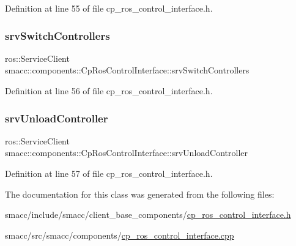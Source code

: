 Definition at line 55 of file cp\+\_\+ros\+\_\+control\+\_\+interface.\+h.

\mbox{\label{classsmacc_1_1components_1_1CpRosControlInterface_a78e45e68567c23ca5c19df0de257c20f}} 
\subsubsection{\texorpdfstring{srv\+Switch\+Controllers}{srvSwitchControllers}}
{\footnotesize\ttfamily ros\+::\+Service\+Client smacc\+::components\+::\+Cp\+Ros\+Control\+Interface\+::srv\+Switch\+Controllers\hspace{0.3cm}{\ttfamily [private]}}



Definition at line 56 of file cp\+\_\+ros\+\_\+control\+\_\+interface.\+h.

\mbox{\label{classsmacc_1_1components_1_1CpRosControlInterface_a0515a2a86bfcd0fdec08fabd3070723c}} 
\subsubsection{\texorpdfstring{srv\+Unload\+Controller}{srvUnloadController}}
{\footnotesize\ttfamily ros\+::\+Service\+Client smacc\+::components\+::\+Cp\+Ros\+Control\+Interface\+::srv\+Unload\+Controller\hspace{0.3cm}{\ttfamily [private]}}



Definition at line 57 of file cp\+\_\+ros\+\_\+control\+\_\+interface.\+h.



The documentation for this class was generated from the following files\+:\begin{DoxyCompactItemize}
\item 
smacc/include/smacc/client\+\_\+base\+\_\+components/\hyperlink{cp__ros__control__interface_8h}{cp\+\_\+ros\+\_\+control\+\_\+interface.\+h}\item 
smacc/src/smacc/components/\hyperlink{cp__ros__control__interface_8cpp}{cp\+\_\+ros\+\_\+control\+\_\+interface.\+cpp}\end{DoxyCompactItemize}
